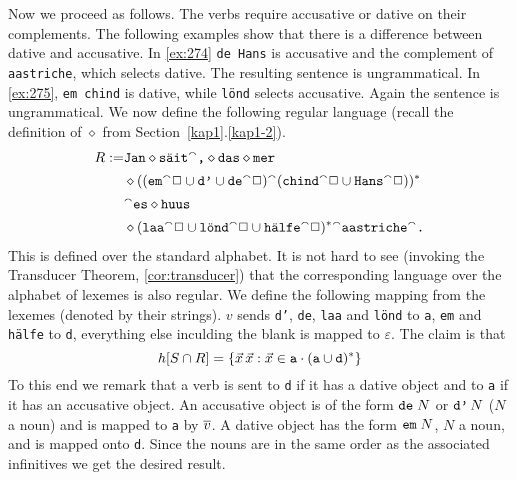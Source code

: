 Now we proceed as follows. The verbs require accusative
or dative on their complements. The following examples
show that there is a difference between dative and accusative.
In \eqref{ex:274} {\tt de Hans} is accusative and the complement
of {\tt aastriche}, which selects dative. The resulting sentence
is ungrammatical. In \eqref{ex:275}, {\tt em chind} is dative,
while {\tt l\"ond} selects accusative. Again the sentence is
ungrammatical. We now define the following regular language 
(recall the definition of $\diamond$ from Section~\ref{kap1}.\ref{kap1-2}).
\begin{align}
R := & \mbox{\tt Jan}\diamond\mbox{\tt s\"ait}{^{\smallfrown}}\mbox{\tt ,}\diamond
	\mbox{\tt das} \diamond \mbox{\tt mer} \\\notag 
     & \diamond ((\mbox{\tt em}{^{\smallfrown}}\Box \cup \mbox{\tt d'} \cup 
	\mbox{\tt de}{^{\smallfrown}}\Box) {^{\smallfrown}} (\mbox{\tt chind}{^{\smallfrown}}\Box \cup 
	\mbox{\tt Hans}{^{\smallfrown}}\Box))^{\ast} \\\notag 
     & {^{\smallfrown}} \mbox{\tt es}\diamond \mbox{\tt huus} \\\notag
     & \diamond (\mbox{\tt laa}{^{\smallfrown}}\Box \cup \mbox{\tt l\"ond}{^{\smallfrown}}\Box 
	\cup \mbox{\tt h\"alfe}{^{\smallfrown}}\Box)^{\ast} {^{\smallfrown}}
	\mbox{\tt aastriche}{^{\smallfrown}}\mbox{\tt .}
\end{align}
This is defined over the standard alphabet. It is not hard to see 
(invoking the Transducer Theorem, 
\ref{cor:transducer}) that the 
corresponding language over the alphabet of lexemes is also regular. 
We define the following mapping from the lexemes (denoted by their 
strings). $v$ sends {\tt d'}, {\tt de}, {\tt laa} and {\tt l\"ond} 
to {\tt a}, {\tt em} and {\tt h\"alfe} to {\tt d}, everything else 
inculding the blank is mapped to $\varepsilon$. The claim is that
\begin{equation}
h[S \cap R] = \{\vec{x}\, \vec{x} : \vec{x} \in
\mbox{\tt a} \cdot (\mbox{\tt a} \cup \mbox{\tt d})^{\ast}\}
\end{equation}
To this end we remark that a verb is sent to {\tt d} if it has a
dative object and to {\tt a} if it has an accusative object. An
accusative object is of the form $\mbox{\tt de}\; N$ or $\mbox{\tt
d'}\,  N$ ($N$ a noun) and is mapped to {\tt a} by $\overline{v}$. A
dative object has the form $\mbox{\tt em}\;  N$, $N$ a noun, and
is mapped onto {\tt d}. Since the nouns are in the same order as
the associated infinitives we get the desired result.

